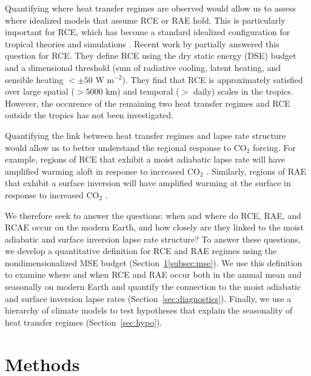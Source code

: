 \documentclass{ametsocV5}
\begin{document}
Quantifying where heat transfer regimes are observed would allow us to assess where idealized models that assume RCE or RAE hold. This is particularly important for RCE, which has become a standard idealized configuration for tropical theories \citep[e.g.,][]{emanuel1996,nilsson1999,romps2014,singh2015} and simulations \citep[][and the references therein]{wing2018}. Recent work by \cite{jakob2019} partially answered this question for RCE. They define RCE using the dry static energy (DSE) budget and a dimensional threshold (sum of radiative cooling, latent heating, and sensible heating $< \pm 50$ W m$^{-2}$). They find that RCE is approximately satisfied over large spatial ($>5000$ km) and temporal ($>$ daily) scales in the tropics. However, the occurence of the remaining two heat transfer regimes and RCE outside the tropics has not been investigated.

Quantifying the link between heat transfer regimes and lapse rate structure would allow us to better understand the regional response to CO$_2$ forcing. For example, regions of RCE that exhibit a moist adiabatic lapse rate will have amplified warming aloft in response to increased CO$_2$ \citep{romps2011}. Similarly, regions of RAE that exhibit a surface inversion will have amplified warming at the surface in response to increased CO$_2$ \citep{cronin2016}.%

We therefore seek to answer the questions: when and where do RCE, RAE, and RCAE occur on the modern Earth, and how closely are they linked to the moist adiabatic and surface inversion lapse rate structure? To answer these questions, we develop a quantitative definition for RCE and RAE regimes using the nondimensionalized MSE budget (Section~\ref{sec:methods}\ref{subsec:mse}). We use this definition to examine where and when RCE and RAE occur both in the annual mean and seasonally on modern Earth and quantify the connection to the moist adiabatic and surface inversion lapse rates (Section~\ref{sec:diagnostics}). Finally, we use a hierarchy of climate models to test hypotheses that explain the seasonality of heat transfer regimes (Section~\ref{sec:hypo}).

\section{Methods}\label{sec:methods}
\end{document}
